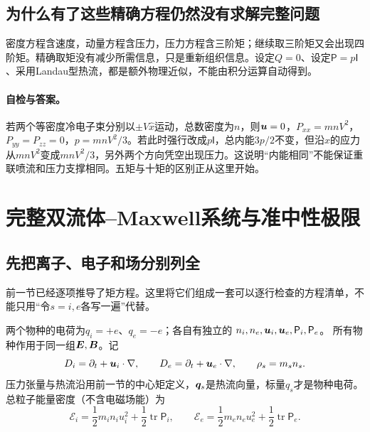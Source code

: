 \documentclass[UTF8,a4paper,11pt,openany,fontset=fandol]{ctexbook}
\begin{document}
\subsection{为什么有了这些精确方程仍然没有求解完整问题}
密度方程含速度，动量方程含压力，压力方程含三阶矩；继续取三阶矩又会出现四阶矩。精确取矩没有减少所需信息，只是重新组织信息。设定$Q=0$、设定$\mathsf P=p\mathsf I$、采用Landau型热流，都是额外物理近似，不能由积分运算自动得到。

\paragraph{自检与答案。}
若两个等密度冷电子束分别以$\pm V\hat x$运动，总数密度为$n$，则$\bm{u}=0$，$P_{xx}=mnV^2$，$P_{yy}=P_{zz}=0$，$p=mnV^2/3$。若此时强行改成$p\mathsf I$，总内能$3p/2$不变，但沿$x$的应力从$mnV^2$变成$mnV^2/3$，另外两个方向凭空出现压力。这说明“内能相同”不能保证重联喷流和压力支撑相同。五矩与十矩的区别正从这里开始。\citep{Wang2015,Ng2020}


\section{完整双流体--Maxwell系统与准中性极限}\label{sec:twofluid-system}
\subsection{先把离子、电子和场分别列全}\label{sec:full-twofluid}
前一节已经逐项推导了矩方程。这里将它们组成一套可以逐行检查的方程清单，不能只用“令$s=i,e$各写一遍”代替。

两个物种的电荷为$q_i=+e$、$q_e=-e$；各自有独立的
$n_i,n_e,\bm{u}_i,\bm{u}_e,\mathsf P_i,\mathsf P_e$。
所有物种作用于同一组$\bm{E},\bm{B}$。记
\begin{equation}
 D_i=\partial_t+\bm{u}_i\cdot\nabla,\qquad
 D_e=\partial_t+\bm{u}_e\cdot\nabla,\qquad \rho_s=m_sn_s.
\end{equation}
压力张量与热流沿用前一节的中心矩定义，$\bm{q}_s$是热流向量，标量$q_s$才是物种电荷。总粒子能量密度（不含电磁场能）为
\begin{equation}
 \mathcal E_i=\frac12m_in_i u_i^2+\frac12\operatorname{tr}\mathsf P_i,\qquad
 \mathcal E_e=\frac12m_en_e u_e^2+\frac12\operatorname{tr}\mathsf P_e.
 \label{eq:twofluid-energy-def}
\end{equation}
\end{document}
